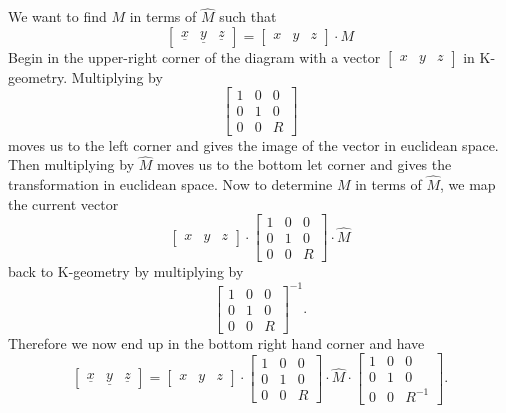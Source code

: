 \documentclass{ximera}
\begin{document}
\begin{problem}
\begin{freeResponse}
We want to find $M$ in terms of $\hat{M}$ such that 
\[
\begin{bmatrix}
\underline{x} & \underline{y} & \underline{z}%
\end{bmatrix}
=\begin{bmatrix}
x & y & z
\end{bmatrix}
\cdot M
\]
Begin in the upper-right corner of the diagram with a vector
$\begin{bmatrix}
x & y & z
\end{bmatrix}
$ in K-geometry. Multiplying by 
\[
\begin{bmatrix}
1 & 0 & 0\\
0 & 1 & 0\\
0 & 0 & R
\end{bmatrix}
\]
moves us to the left corner and gives the image of the vector in euclidean space. Then multiplying by $\hat{M}$ moves us to the bottom let corner and gives the transformation in euclidean space. Now to determine $M$ in terms of $\hat{M}$, we map the current vector
\[
\begin{bmatrix}
x & y & z
\end{bmatrix}
  \cdot\begin{bmatrix}
%
1 & 0 & 0\\
0 & 1 & 0\\
0 & 0 & R
\end{bmatrix}
  \cdot\hat{M}
  \]
back to K-geometry by multiplying by 
\[
\begin{bmatrix}
1 & 0 & 0\\
0 & 1 & 0\\
0 & 0 & R
\end{bmatrix}^{-1}.
\]
 Therefore we now end up in the bottom right hand corner and have
\[
\begin{bmatrix}
\underline{x} & \underline{y} & \underline{z}%
\end{bmatrix}
=\begin{bmatrix}
x & y & z
\end{bmatrix}
  \cdot\begin{bmatrix}
%
1 & 0 & 0\\
0 & 1 & 0\\
0 & 0 & R
\end{bmatrix}
  \cdot\hat{M}\cdot\begin{bmatrix}
%
1 & 0 & 0\\
0 & 1 & 0\\
0 & 0 & R^{-1}
\end{bmatrix}.
\]

\end{freeResponse}
\end{problem}
\end{document}
